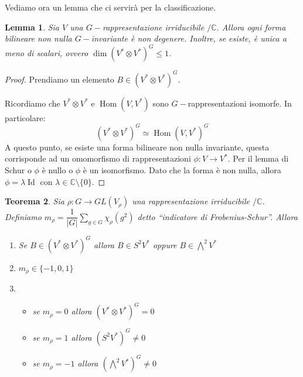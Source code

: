 \documentclass[11pt]{article}
\theoremstyle{plain}
\newtheorem{thm}{Teorema}[section]
\newtheorem{lemma}[thm]{Lemma}
\theoremstyle{definition}
\theoremstyle{remark}
\newcommand{\C}{\mathbb{C}}
\newcommand{\dsum}{\displaystyle\sum}
\DeclareMathOperator{\Hom}{Hom}
\DeclareMathOperator{\Id}{Id}
\DeclareMathOperator{\iso}{\simeq}
\begin{document}
Vediamo ora un lemma che ci servirà per la classificazione.
\begin{lemma}
Sia $V$ una $G-$rappresentazione irriducibile $/\C$. Allora ogni forma bilineare non nulla $G-$invariante è non degenere. Inoltre, se esiste, è unica a meno di scalari, ovvero $\dim (V^*\otimes V^*)^G\le1$.
\end{lemma}
\begin{proof}
Prendiamo un elemento $B \in \left( V^* \otimes V^*\right) ^G$.

Ricordiamo che $V^* \otimes V^*$ e $\Hom(V, V^*)$ sono $G-$rappresentazioni isomorfe. In particolare:
\[\left(V^* \otimes V^*\right)^G \iso \Hom(V, V^*)^G \]
A questo punto, se esiste una forma bilineare non nulla invariante, questa corrisponde ad un omomorfismo di rappresentazioni $\phi: V\to V^*$.
Per il lemma di Schur o $\phi$ è nullo o $\phi$ è un isomorfismo. Dato che la forma è non nulla, allora $\phi = \lambda \Id$ con $\lambda \in \C\setminus\{0\}$.
\end{proof}


\begin{thm}
Sia $\rho:G\to GL(V_\rho)$ una rappresentazione irriducibile $/\C$.\\
Definiamo $m_\rho = \dfrac{1}{|G|} \dsum_{g \in G} \chi_{\rho}(g^2)$ detto ``indicatore di Frobenius-Schur''. Allora
\begin{enumerate}
\item Se $B \in (V^* \otimes V^*)^G$ allora $B \in S^2V^*$ oppure $B \in \bigwedge ^2 V^*$
\item  $m_\rho \in \{-1, 0, 1 \}$
\item{ \begin{itemize}
   \item se $m_\rho = 0$ allora $(V^*\otimes V^*)^G = 0$
   \item se $m_\rho = 1$ allora $(S^2 V^*)^G \neq 0$
   \item se $m_\rho = -1$ allora $(\bigwedge^2 V^*)^G \neq 0$
\end{itemize}
}
\end{enumerate}
\end{thm}
\end{document}

